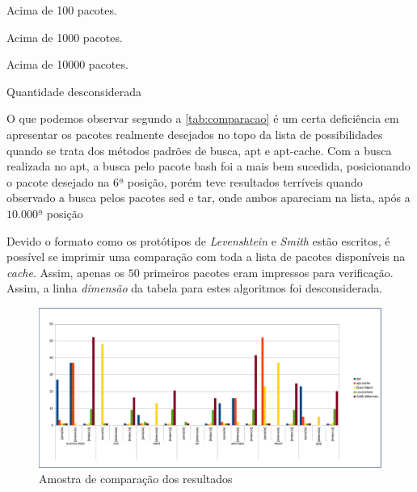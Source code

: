 \begin{table}[htbp]
\label{tab:comparacao}
\begin{description}
	\tiny
	\item [*] Acima de 100 pacotes.
	\item [**] Acima de 1000 pacotes.
	\item [***] Acima de 10000 pacotes.
	\item [$-$] Quantidade desconsiderada
\end{description}

\end{table}



O que  podemos observar  segundo a \autoref{tab:comparacao} é um certa deficiência em apresentar os pacotes realmente desejados no topo da lista de possibilidades quando se trata dos métodos padrões de busca, {\code apt} e {\code apt-cache}. Com a busca realizada no {\code apt}, a busca pelo pacote {\code bash} foi a mais bem sucedida, posicionando o pacote desejado na $6ª$ posição, porém teve resultados terríveis quando observado a busca pelos pacotes {\code sed} e {\code tar}, onde ambos apareciam na lista, após a $10.000ª$ posição


Devido o formato como os protótipos de \textit{Levenshtein} e \textit{Smith} estão escritos, é possível se imprimir uma comparação com toda a lista de pacotes disponíveis na \textit{cache}. Assim, apenas os $50$ primeiros pacotes eram impressos para verificação. Assim, a linha \textit{dimensão} da tabela para estes algoritmos foi desconsiderada.

\begin{figure}[h]
  \centering
	\includegraphics[width=\textwidth,angle=0]{figuras/grafico}
  \caption{Amostra de comparação dos resultados}
  \label{fig:figuras_grafico}
\end{figure}

